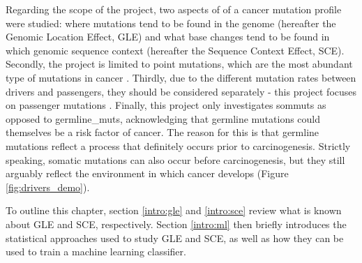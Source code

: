 Regarding the scope of the project, two aspects of of a cancer mutation profile were studied: where mutations tend to be found in the genome (hereafter the Genomic Location Effect, GLE) and what \gls{base} changes tend to be found in which genomic sequence context (hereafter the Sequence Context Effect, SCE). Secondly, the project is limited to point mutations, which are the most abundant type of mutations in cancer \citep{Alexandrov2020}. Thirdly, due to the different mutation rates between drivers and passengers, they should be considered separately - this project focuses on passenger mutations \citep{McFarland2014Tug-of-warProcesses}. Finally, this project only investigates \glspl{sommut} as opposed to \glspl{germline_mut}, acknowledging that germline mutations could themselves be a risk factor of cancer. The reason for this is that germline mutations reflect a process that definitely occurs prior to carcinogenesis. Strictly speaking, somatic mutations can also occur before carcinogenesis, but they still arguably reflect the environment in which cancer develops (Figure \ref{fig:drivers_demo}). 



To outline this chapter, section \ref{intro:gle} and \ref{intro:sce} review what is known about GLE and SCE, respectively. Section \ref{intro:ml} then briefly introduces the statistical approaches used to study GLE and SCE, as well as how they can be used to train a machine learning classifier.

